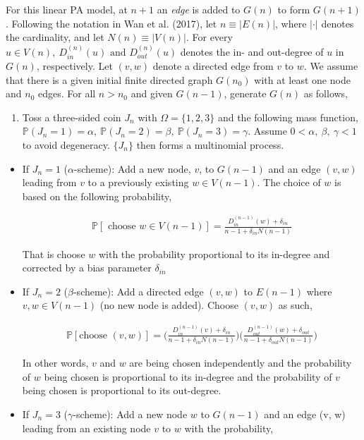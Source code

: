 \documentclass[]{elsarticle} %
\providecommand{\tightlist}{%
  \setlength{\itemsep}{0pt}\setlength{\parskip}{0pt}}
\begin{document}
For this linear PA model, at \(n+1\) an \emph{edge} is added to \(G(n)\)
to form \(G(n+1)\). Following the notation in Wan et al. (2017), let
\(n \equiv | E(n)|\), where \(| \cdot |\) denotes the cardinality, and
let \(N(n) \equiv |V(n)|\). For every
\(u \in V(n), \ D_{in}^{(n)}(u) \text{ and } D_{out}^{(n)}(u)\) denotes
the in- and out-degree of \(u\) in \(G(n)\), respectively. Let
\((v, w)\) denote a directed edge from \(v\) to \(w\). We assume that
there is a given initial finite directed graph \(G(n_0)\) with at least
one node and \(n_0\) edges. For all \(n > n_0\) and given \(G(n-1)\),
generate \(G(n)\) as follows,

\begin{enumerate}
\def\labelenumi{\arabic{enumi}.}
\tightlist
\item
  Toss a three-sided coin \(J_n\) with \(\Omega = \{1, 2, 3\}\) and the
  following mass function,
  \(\mathbb{P}(J_n = 1) = \alpha, \ \mathbb{P}(J_n = 2) = \beta, \ \mathbb{P}(J_n = 3) = \gamma\).
  Assume \(0 < \alpha, \ \beta,\ \gamma < 1\) to avoid degeneracy.
  \(\{ J_n \}\) then forms a multinomial process.
\end{enumerate}

\begin{itemize}
\item
  If \(J_n = 1\) (\(\alpha\)-scheme): Add a new node, \(v\), to
  \(G(n-1)\) and an edge \((v, w)\) leading from \(v\) to a previously
  existing \(w \in V(n-1)\). The choice of \(w\) is based on the
  following probability,

  \begin{align}
  \mathbb{P}[\text{ choose } w \in V(n-1)] = \frac{ D_{in}^{(n-1)}(w) + \delta_{in} }{n - 1 + \delta_{in}N(n-1)}
  \end{align}

  That is choose \(w\) with the probability proportional to its
  in-degree and corrected by a bias parameter \(\delta_{in}\)
\item
  If \(J_n = 2\) (\(\beta\)-scheme): Add a directed edge \((v, w)\) to
  \(E(n-1)\) where \(v, w \in V(n-1)\) (no new node is added). Choose
  \((v, w)\) as such,

  \begin{align}
  \mathbb{P}[\text{choose } (v, w)] = \Big(\frac{ D_{in}^{(n-1)}(v) + \delta_{in} }{n - 1 + \delta_{in}N(n-1)} \Big) \Big( \frac{ D_{out}^{(n-1)}(w) + \delta_{out} }{n - 1 + \delta_{out}N(n-1)}\Big)
  \end{align}

  In other words, \(v\) and \(w\) are being chosen independently and the
  probability of \(w\) being chosen is proportional to its in-degree and
  the probability of \(v\) being chosen is proportional to its
  out-degree.
\item
  If \(J_n = 3\) (\(\gamma\)-scheme): Add a new node \(w\) to \(G(n-1)\)
  and an edge (v, w) leading from an existing node \(v\) to \(w\) with
  the probability,
\end{itemize}
\end{document}
